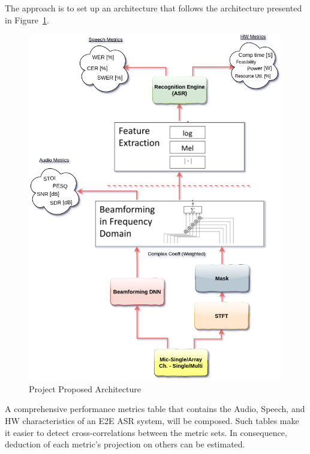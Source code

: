The approach is to set up an architecture 
that follows the architecture presented in
Figure~\ref{fig:proj_blocks}.
\begin{figure}[H]
	\centering
	\includegraphics[width=0.99\textwidth]
	{Introduction/images/proj_blocks}
	\caption{Project Proposed Architecture}\label{fig:proj_blocks}
\end{figure}

A comprehensive performance metrics table that contains the Audio,
Speech, and HW characteristics
of an E2E ASR system, will be composed.
Such tables make it easier to detect cross-correlations between the metric sets.
In consequence, 
deduction of each metric's
projection on others can be estimated.